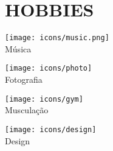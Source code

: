 \section*{\MakeUppercase{Hobbies}}

\begin{minipage}[t]{.15\textwidth}
	\centering
	\vbox{\texttt{[image: icons/music.png]}\\[4pt]Música}
\end{minipage}
\begin{minipage}[t]{.15\textwidth}
	\centering
	\vbox{\texttt{[image: icons/photo]}\\[4pt]Fotografia}	
\end{minipage}
\begin{minipage}[t]{.15\textwidth}
	\centering
	\vbox{\texttt{[image: icons/gym]}\\[4pt]Musculação}
\end{minipage}
\begin{minipage}[t]{.15\textwidth}
	\centering
	\vbox{\texttt{[image: icons/design]}\\[4pt]Design}	
\end{minipage}
